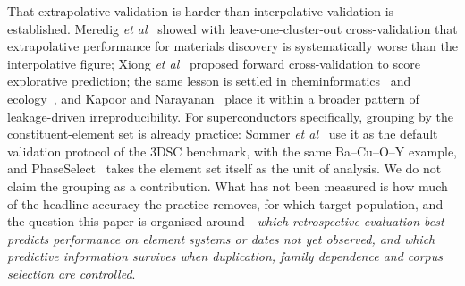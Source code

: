 \documentclass{iopjournal}
\newcommand{\etal}{\textit{et al}}
\begin{document}
That extrapolative validation is harder than interpolative validation is established. Meredig
\etal~\cite{meredig2018} showed with leave-one-cluster-out cross-validation that extrapolative
performance for materials discovery is systematically worse than the interpolative figure; Xiong
\etal~\cite{xiong2020} proposed forward cross-validation to score explorative prediction; the same
lesson is settled in cheminformatics~\cite{sheridan2013} and ecology~\cite{roberts2017}, and Kapoor
and Narayanan~\cite{kapoor2023} place it within a broader pattern of leakage-driven
irreproducibility. For superconductors specifically, grouping by the constituent-element set is
already practice: Sommer \etal~\cite{sommer2023} use it as the default validation protocol of the
3DSC benchmark, with the same Ba--Cu--O--Y example, and PhaseSelect~\cite{vasylenko2023} takes the
element set itself as the unit of analysis. We do not claim the grouping as a contribution. What
has not been measured is how much of the headline accuracy the practice removes, for which target
population, and---the question this paper is organised around---\emph{which retrospective
evaluation best predicts performance on element systems or dates not yet observed, and which
predictive information survives when duplication, family dependence and corpus selection are
controlled}.
\end{document}

